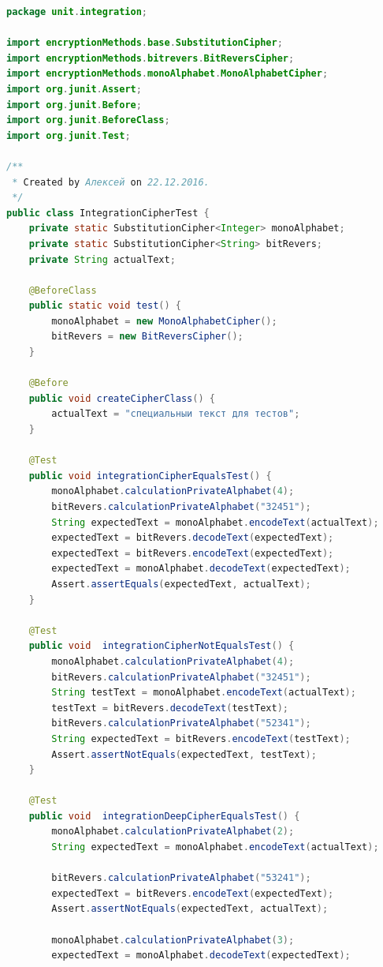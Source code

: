 \documentclass[a4paper,12pt]{article}
\begin{document}
\begin{lstlisting}[language=java, caption=код модуля IntegrationCipherTest.java]
package unit.integration;

import encryptionMethods.base.SubstitutionCipher;
import encryptionMethods.bitrevers.BitReversCipher;
import encryptionMethods.monoAlphabet.MonoAlphabetCipher;
import org.junit.Assert;
import org.junit.Before;
import org.junit.BeforeClass;
import org.junit.Test;

/**
 * Created by Алексей on 22.12.2016.
 */
public class IntegrationCipherTest {
    private static SubstitutionCipher<Integer> monoAlphabet;
    private static SubstitutionCipher<String> bitRevers;
    private String actualText;

    @BeforeClass
    public static void test() {
        monoAlphabet = new MonoAlphabetCipher();
        bitRevers = new BitReversCipher();
    }

    @Before
    public void createCipherClass() {
        actualText = "специальныи текст для тестов";
    }

    @Test
    public void integrationCipherEqualsTest() {
        monoAlphabet.calculationPrivateAlphabet(4);
        bitRevers.calculationPrivateAlphabet("32451");
        String expectedText = monoAlphabet.encodeText(actualText);
        expectedText = bitRevers.decodeText(expectedText);
        expectedText = bitRevers.encodeText(expectedText);
        expectedText = monoAlphabet.decodeText(expectedText);
        Assert.assertEquals(expectedText, actualText);
    }

    @Test
    public void  integrationCipherNotEqualsTest() {
        monoAlphabet.calculationPrivateAlphabet(4);
        bitRevers.calculationPrivateAlphabet("32451");
        String testText = monoAlphabet.encodeText(actualText);
        testText = bitRevers.decodeText(testText);
        bitRevers.calculationPrivateAlphabet("52341");
        String expectedText = bitRevers.encodeText(testText);
        Assert.assertNotEquals(expectedText, testText);
    }

    @Test
    public void  integrationDeepCipherEqualsTest() {
        monoAlphabet.calculationPrivateAlphabet(2);
        String expectedText = monoAlphabet.encodeText(actualText);

        bitRevers.calculationPrivateAlphabet("53241");
        expectedText = bitRevers.encodeText(expectedText);
        Assert.assertNotEquals(expectedText, actualText);

        monoAlphabet.calculationPrivateAlphabet(3);
        expectedText = monoAlphabet.decodeText(expectedText);


\end{lstlisting}
\end{document}

